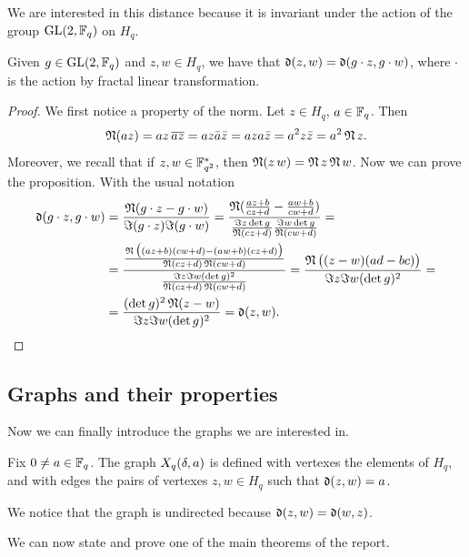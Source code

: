 We are interested in this distance because it is invariant under the action of the group $\operatorname{GL}(2,{\mathbb F}_q)$ on $H_q$.
\begin{prop}
Given $g \in \operatorname{GL}(2,{\mathbb F}_q)$ and $z,w \in H_q$, we have that $\operatorname{\mathfrak{d}} (z,w)=\operatorname{\mathfrak{d}}(g \cdot z,g\cdot w)$,
where $\cdot$ is the action by fractal linear transformation.
\begin{proof}
We first notice a property of the norm. Let $z\in H_q$, $a\in {\mathbb F}_q$. Then
\begin{equation}\label{norm_prop}
\operatorname{\mathfrak{N}} (az) = az \, \overline{az} = az\bar{a}\bar{z}=aza\bar{z}=a^2 z \bar{z}=a^2 \operatorname{\mathfrak{N}} z.
\end{equation}
Moreover, we recall that if $z,w \in {\mathbb F}_{q^2}^{*}$, then $\operatorname{\mathfrak{N}} (z\,w)= \operatorname{\mathfrak{N}} z \operatorname{\mathfrak{N}} w$.
Now we can prove the proposition. With the usual notation
	\begin{align*}
	\operatorname{\mathfrak{d}} (g\cdot z,g\cdot w)&=\frac{\operatorname{\mathfrak{N}} (g\cdot z-g\cdot w)}{\Im (g\cdot z) \Im (g\cdot w)}
							  =\frac{\operatorname{\mathfrak{N}}(\frac{az+b}{cz+d} -
							   \frac{aw+b}{cw+d})}{\frac{\Im z \det g}{\operatorname{\mathfrak{N}} (cz+d)}\frac{\Im w \det g}{\operatorname{\mathfrak{N}} (cw+d)}}=\\
							  &=\frac{\frac{\operatorname{\mathfrak{N}}\big((az+b)(cw+d)-(aw+b)(cz+d)\big)}{\operatorname{\mathfrak{N}}(cz+d)\operatorname{\mathfrak{N}} (cw+d)}}
							  {\frac{\Im z \Im w (\det g)^2}{\operatorname{\mathfrak{N}} (cz+d)\operatorname{\mathfrak{N}} (cw+d)}}
							  =\frac{\operatorname{\mathfrak{N}} \big((z-w)(ad-bc)\big)}{\Im z \Im w (\det g)^2}=\\
							  &=\frac{(\det g)^2 \operatorname{\mathfrak{N}} (z-w)}{\Im z \Im w (\det g)^2}=\operatorname{\mathfrak{d}} (z,w).
	\end{align*}
\end{proof}
\end{prop}

\subsection{Graphs and their properties}
Now we can finally introduce the graphs we are interested in.
\begin{defn}
 Fix $0\neq a\in {\mathbb F}_q$. The graph $X_q (\delta ,a)$ is defined with vertexes the elements of $H_q$,
 and with edges the pairs of vertexes $z,w\in H_q$ such that $\operatorname{\mathfrak{d}} (z,w) = a$.
\end{defn}
\begin{rem}
We notice that the graph is undirected because $\operatorname{\mathfrak{d}} (z,w) = \operatorname{\mathfrak{d}} (w,z)$.
\end{rem}
We can now state and prove one of the main theorems of the report.

